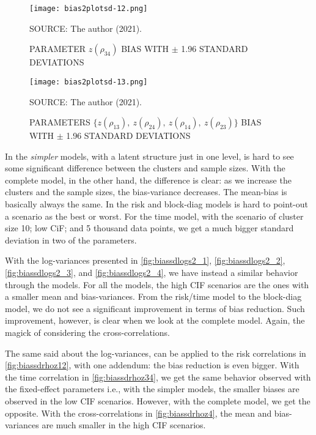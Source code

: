 \begin{figure}[H]
 \setlength{\abovecaptionskip}{.0001pt}
 \caption{PARAMETER \(z(\rho_{34})\) BIAS WITH \(\pm\) 1.96 STANDARD
          DEVIATIONS}
 \vspace{0.2cm}\centering
 \texttt{[image: bias2plotsd-12.png]}\\
 \begin{footnotesize}
  SOURCE: The author (2021).
 \end{footnotesize}
 \label{fig:biassdrhoz34}
\end{figure}

\begin{figure}[H]
 \setlength{\abovecaptionskip}{.0001pt}
 \caption{PARAMETERS
          \(\{z(\rho_{13}),~z(\rho_{24}),~z(\rho_{14}),~z(\rho_{23})\}\)
          BIAS WITH \(\pm\) 1.96 STANDARD DEVIATIONS}
 \vspace{0.2cm}\centering
 \texttt{[image: bias2plotsd-13.png]}\\
 \begin{footnotesize}
  SOURCE: The author (2021).
 \end{footnotesize}
 \label{fig:biassdrhoz4}
\end{figure}

In the \textit{simpler} models, with a latent structure just in one
level, is hard to see some significant difference between the clusters
and sample sizes. With the complete model, in the other hand, the
difference is clear: as we increase the clusters and the sample sizes,
the bias-variance decreases. The mean-bias is basically always the
same. In the risk and block-diag models is hard to point-out a scenario
as the best or worst. For the time model, with the scenario of cluster
size 10; low CiF; and 5 thousand data points, we get a much bigger
standard deviation in two of the parameters.

With the log-variances presented in \autoref{fig:biassdlogs2_1},
\autoref{fig:biassdlogs2_2}, \autoref{fig:biassdlogs2_3}, and
\autoref{fig:biassdlogs2_4}, we have instead a similar behavior through
the models. For all the models, the high CIF scenarios are the ones with
a smaller mean and bias-variances. From the risk/time model to the
block-diag model, we do not see a significant improvement in terms of
bias reduction. Such improvement, however, is clear when we look at the
complete model. Again, the magick of considering the cross-correlations.

The same said about the log-variances, can be applied to the risk
correlations in \autoref{fig:biassdrhoz12}, with one addendum: the bias
reduction is even bigger. With the time correlation in
\autoref{fig:biassdrhoz34}, we get the same behavior observed with the
fixed-effect parameters i.e., with the simpler models, the smaller
biases are observed in the low CIF scenarios. However, with the complete
model, we get the opposite. With the cross-correlations in
\autoref{fig:biassdrhoz4}, the mean and bias-variances are much smaller
in the high CIF scenarios.

